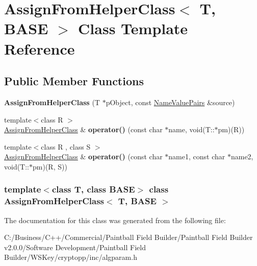 \hypertarget{class_assign_from_helper_class}{
\section{AssignFromHelperClass$<$ T, BASE $>$ Class Template Reference}
\label{class_assign_from_helper_class}
}
\subsection*{Public Member Functions}
\begin{DoxyCompactItemize}
\item 
\hypertarget{class_assign_from_helper_class_a797db37f8aa7d7f59e9b4b595bc66ed6}{
{\bfseries AssignFromHelperClass} (T $\ast$pObject, const \hyperlink{class_name_value_pairs}{NameValuePairs} \&source)}
\label{class_assign_from_helper_class_a797db37f8aa7d7f59e9b4b595bc66ed6}

\item 
\hypertarget{class_assign_from_helper_class_a27a532c78379e64b09cf830893d69be0}{
{\footnotesize template$<$class R $>$ }\\\hyperlink{class_assign_from_helper_class}{AssignFromHelperClass} \& {\bfseries operator()} (const char $\ast$name, void(T::$\ast$pm)(R))}
\label{class_assign_from_helper_class_a27a532c78379e64b09cf830893d69be0}

\item 
\hypertarget{class_assign_from_helper_class_ae405d308e1aa394aeb0ffe9b8cffed32}{
{\footnotesize template$<$class R , class S $>$ }\\\hyperlink{class_assign_from_helper_class}{AssignFromHelperClass} \& {\bfseries operator()} (const char $\ast$name1, const char $\ast$name2, void(T::$\ast$pm)(R, S))}
\label{class_assign_from_helper_class_ae405d308e1aa394aeb0ffe9b8cffed32}

\end{DoxyCompactItemize}
\subsubsection*{template$<$class T, class BASE$>$ class AssignFromHelperClass$<$ T, BASE $>$}



The documentation for this class was generated from the following file:\begin{DoxyCompactItemize}
\item 
C:/Business/C++/Commercial/Paintball Field Builder/Paintball Field Builder v2.0.0/Software Development/Paintball Field Builder/WSKey/cryptopp/inc/algparam.h\end{DoxyCompactItemize}
